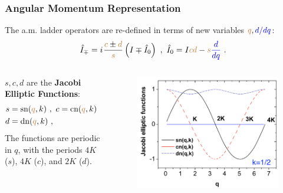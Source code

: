 \documentclass{beamer}
\newcommand{\iu}{{i\mkern1mu}}
\begin{document}
\begin{frame}
  \frametitle{Angular Momentum Representation}
  The a.m. ladder operators are re-defined in terms of new variables ${\color{brown}q},{\color{blue}d/dq}$:
  \begin{align}
    \hat{I}_\mp=\iu\frac{{\color{brown}c}\pm {\color{brown}d}}{\color{brown}s}\left(I\mp\hat{I}_0\right)\ ,\ \hat{I}_0=I{\color{brown}cd}-{\color{brown}s}{\color{blue}\frac{d}{dq}}\ .
  \end{align}
  \begin{columns} 
    $s,c,d$ are the \textbf{Jacobi Elliptic Functions}:
    \begin{align}
      s&=\text{sn}({\color{brown}q},k)\ ,\ c=\text{cn}({\color{brown}q},k)\ \\
      d&=\text{dn}({\color{brown}q},k)\ ,
    \end{align}
    The functions are periodic in $q$, with the periods $4K$ ($s$), $4K$ ($c$), and $2K$ ($d$).
    \begin{figure}
      \includegraphics[scale=0.18]{figures/jacobi-functions.png}
    \end{figure}
    \end{columns}
\end{frame}
\end{document}
